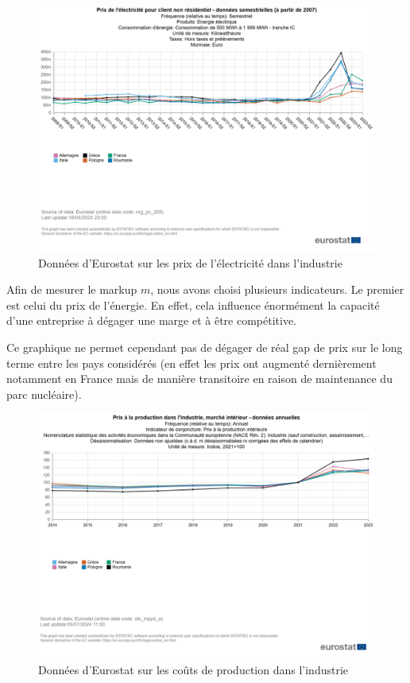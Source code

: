 \documentclass{article}
\begin{document}
\begin{figure}[H]
  \centering
  \begin{minipage}{0.8\textwidth}
      \centering
      \includegraphics[width=\textwidth]{"prix_elec_2.png"}
      \caption{Données d'Eurostat sur les prix de l'électricité dans l'industrie}
  \end{minipage}
\end{figure}
\vspace{0.5cm}

Afin de mesurer le markup $m$, nous avons choisi plusieurs indicateurs. Le premier est celui du prix de l'énergie. En effet, cela influence énormément la capacité d'une entreprise à dégager une marge et à être compétitive.

Ce graphique ne permet cependant pas de dégager de réal gap de prix sur le long terme entre les pays considérés (en effet les prix ont augmenté dernièrement notamment en France mais de manière transitoire en raison de maintenance du parc nucléaire).

\begin{figure}[H]
  \centering
  \begin{minipage}{0.8\textwidth}
      \centering
      \includegraphics[width=\textwidth]{"prix_prod.png"}
      \caption{Données d'Eurostat sur les coûts de production dans l'industrie}
  \end{minipage}
\end{figure}
\vspace{0.5cm}
\end{document}
